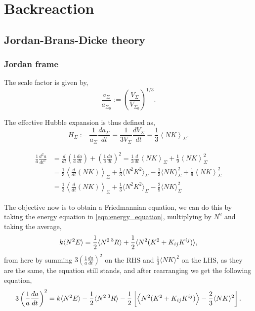 \chapter{Backreaction}


\section{Jordan-Brans-Dicke theory}

\subsection{Jordan frame}

The scale factor is given by,
\begin{equation}
    \frac{a_\Sigma}{a_{\Sigma_0}}:=\left(\frac{V_\Sigma}{V_{\Sigma_0}}\right)^{1/3}.
\end{equation}

The effective Hubble expansion is thus defined as,
\begin{equation}
    H_{\Sigma} := \frac{1}{a_{\Sigma}}\frac{da_{\Sigma}}{dt}\equiv \frac{1}{3V_{\Sigma}}\frac{dV_{\Sigma}}{dt}\equiv\frac{1}{3}\left\langle NK \right\rangle_{\Sigma}.
    \label{eqn:def_scale_factor}
\end{equation}

\begin{align}
    \frac{1}{a}\frac{d^2a}{dt^2}&=\frac{d}{dt}\left(\frac{1}{a}\frac{da}{dt}\right)+\left(\frac{1}{a}\frac{da}{dt}\right)^2=\frac{1}{3}\frac{d}{dt}\left\langle NK \right\rangle_{\Sigma}+\frac{1}{9}\left\langle NK \right\rangle_{\Sigma}^2\nonumber\\
    &=\frac{1}{3}\left\langle \frac{d}{dt}(NK) \right\rangle_{\Sigma}+\frac{1}{3}\langle N^2K^2\rangle_{\Sigma}-\frac{1}{3}\langle NK\rangle^2_\Sigma+\frac{1}{9}\left\langle NK \right\rangle_{\Sigma}^2\nonumber\\
    &=\frac{1}{3}\left\langle \frac{d}{dt}(NK) \right\rangle_{\Sigma}+\frac{1}{3}\langle N^2K^2\rangle_{\Sigma}-\frac{2}{9}\langle NK\rangle^2_\Sigma
    \label{eqn:useful_51}
\end{align}


The objective now is to obtain a Friedmannian equation, we can do this by taking the energy equation in \cref{eqn:energy_equation}, multiplying by $N^2$ and taking the average,
\begin{equation}
    k\langle N^2E\rangle=\frac{1}{2}\langle N^2\prescript{3}{}{R}\rangle+\frac{1}{2}\langle N^2(K^2+K_{ij}K^{ij})\rangle,
\end{equation}
from here by summing $3\left(\frac{1}{a}\frac{da}{dt}\right)^2$ on the RHS and $\frac{1}{3}\langle NK\rangle^2$ on the LHS, as they are the same, the equation still stands, and after rearranging we get the following equation,
\begin{equation}
    3\left(\frac{1}{a}\frac{da}{dt}\right)^2=k\langle N^2E\rangle-\frac{1}{2}\langle N^2\prescript{3}{}{R}\rangle-\frac{1}{2}\left[\left\langle N^2(K^2+K_{ij}K^{ij})\right\rangle-\frac{2}{3}\langle NK\rangle^2\right].
\end{equation}



